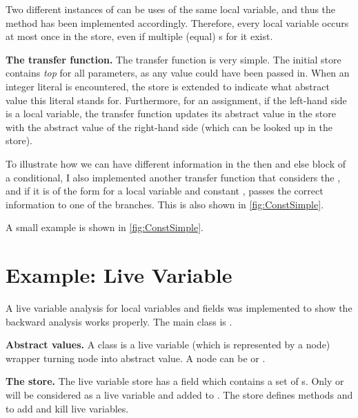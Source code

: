Two different instances of  can be uses of the
same local variable, and thus the  method has been
implemented accordingly. Therefore, every local variable occurs at
most once in the store, even if multiple (equal)
s for it exist.

\textbf{The transfer function.} The transfer function is very
simple. The initial store contains \emph{top} for all parameters, as
any value could have been passed in.  When an integer literal is
encountered, the store is extended to indicate what abstract value
this literal stands for. Furthermore, for an assignment, if the
left-hand side is a local variable, the transfer function updates its
abstract value in the store with the abstract value of the right-hand
side (which can be looked up in the store).

To illustrate how we can have different information in the then and
else block of a conditional, I also implemented another transfer
function that considers the , and if it is of the
form  for a local variable  and constant
, passes the correct information to one of the branches. This
is also shown in \autoref{fig:ConstSimple}.

 A small example is shown in \autoref{fig:ConstSimple}.



\section{Example: Live Variable}
\label{sec:live_variable}
A live variable analysis for local variables and fields was implemented
to show the backward analysis works properly. The main class is
.

\textbf{Abstract values.} A class  is a live
variable (which is represented by a node) wrapper turning node into
abstract value. A node can be  or .

\textbf{The store.} The live variable store  has a field
 which contains a set of s. Only
 or  will be considered as a
live variable and added to . The store defines methods
 and  to add
and kill live variables.

